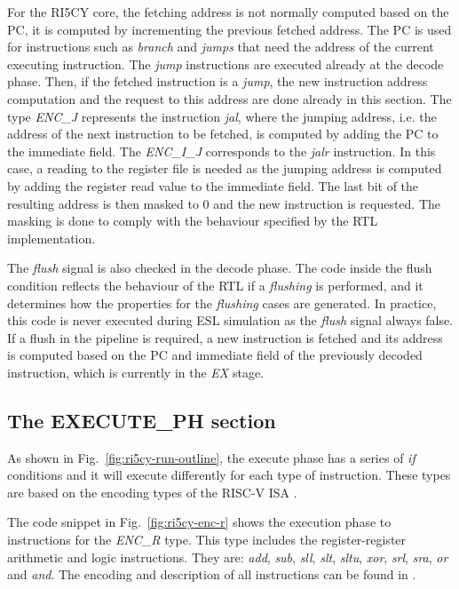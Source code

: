 For the RI5CY core, the fetching address is not normally computed based on the PC, it is computed by incrementing the previous fetched address. The PC is used for instructions such as \textit{branch} and \textit{jumps} that need the address of the current executing instruction. The \textit{jump} instructions are executed already at the decode phase. Then, if the fetched instruction is a \textit{jump}, the new instruction address computation and the request to this address are done already in this section. The type \textit{ENC\_J} represents the instruction \textit{jal}, where the jumping address, i.e. the address of the next instruction to be fetched, is computed by adding the PC to the immediate field. The \textit{ENC\_I\_J} corresponds to the \textit{jalr} instruction. In this case, a reading to the register file is needed as the jumping address is computed by adding the register read value to the immediate field. The last bit of the resulting address is then masked to 0 and the new instruction is requested. The masking is done to comply with the behaviour specified by the RTL implementation. 

The \textit{flush} signal is also checked in the decode phase. The code inside the flush condition reflects the behaviour of the RTL if a \textit{flushing} is performed, and it determines how the properties for the \textit{flushing} cases are generated. In practice, this code is never executed during ESL simulation as the \textit{flush} signal always false. If a flush in the pipeline is required, a new instruction is fetched and its address is computed based on the PC and immediate field of the previously decoded instruction, which is currently in the \textit{EX} stage. 

\subsection*{The EXECUTE\_PH section}

As shown in Fig.~\ref{fig:ri5cy-run-outline}, the execute phase has a series of \textit{if} conditions and it will execute differently for each type of instruction. These types are based on the encoding types of the RISC-V ISA \cite{spec-riscv}.

The code snippet in Fig.~\ref{fig:ri5cy-enc-r} shows the execution phase to instructions for the \textit{ENC\_R} type. This type includes the register-register arithmetic and logic instructions. They are: \textit{add}, \textit{sub}, \textit{sll}, \textit{slt}, \textit{sltu}, \textit{xor}, \textit{srl}, \textit{sra}, \textit{or} and \textit{and}. The encoding and description of all instructions can be found in \cite{spec-riscv}. 

